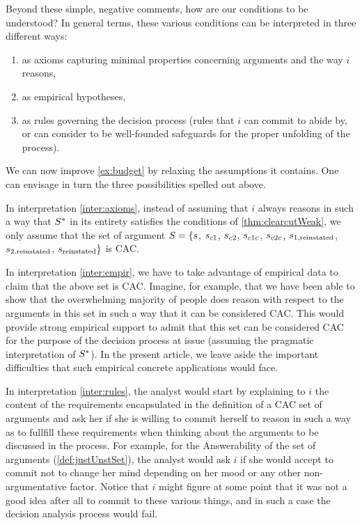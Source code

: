 \documentclass[version=3.21, pagesize, twoside=off, bibliography=totoc, DIV=calc, fontsize=12pt, a4paper]{scrartcl}
\begin{document}
Beyond these simple, negative comments, how are our conditions to be understood? In general terms, these various conditions can be interpreted in three different ways:
\begin{enumerate}[label=({\roman*})]
	\item \label{inter:axioms} as axioms capturing minimal properties concerning arguments and the way $i$ reasons,
	\item \label{inter:empir} as empirical hypotheses,
	\item \label{inter:rules} as rules governing the decision process (rules that $i$ can commit to abide by, or can consider to be well-founded safeguards for the proper unfolding of the process).
\end{enumerate}

\begin{example}
\label{ex:budgetInterpr}
We can now improve \cref{ex:budget} by relaxing the assumptions it contains. One can envisage in turn the three possibilities spelled out above.

In interpretation \ref{inter:axioms}, instead of assuming that $i$ always reasons in such a way that $S^*$ in its entirety satisfies the conditions of \cref{thm:clearcutWeak}, we only assume that the set of argument $S = \{s$, $s_{c1}$, $s_{c2}$, $s_{c1c}$, $s_{c2c}$, $s_{1, \text{reinstated}}$, $s_{2, \text{reinstated}}$, $s_\text{reinstated}\}$ is CAC.

In interpretation \ref{inter:empir}, we have to take advantage of empirical data to claim that the above set is CAC. Imagine, for example, that we have been able to show that the overwhelming majority of people does reason with respect to the arguments in this set in such a way that it can be considered CAC. This would provide strong empirical support to admit that this set can be considered CAC for the purpose of the decision process at issue (assuming the pragmatic interpretation of $S^*$). In the present article, we leave aside the important difficulties that such empirical concrete applications would face.

In interpretation \ref{inter:rules}, the analyst would start by explaining to $i$ the content of the requirements encapsulated in the definition of a CAC set of arguments and ask her if she is willing to commit herself to reason in such a way as to fullfill these requirements when thinking about the arguments to be discussed in the process. For example, for the Answerability of the set of arguments (\cref{def:justUnstSet}), the analyst would ask $i$ if she would accept to commit not to change her mind depending on her mood or any other non-argumentative factor. Notice that $i$ might figure at some point that it was not a good idea after all to commit to these various things, and in such a case the decision analysis process would fail.
\end{example}
\end{document}
